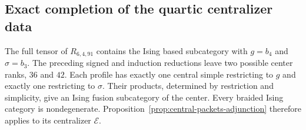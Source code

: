 \subsection{Exact completion of the quartic centralizer data}
\label{subsec:frontier-quartic-completion}

The full tensor of $R_{6,4,91}$ contains the Ising based subcategory
with $g=b_4$ and $\sigma=b_3$. The preceding signed and induction
reductions leave two possible center ranks, $36$ and $42$. Each profile
has exactly one central simple restricting to $g$ and exactly one
restricting to $\sigma$. Their products, determined by restriction and
simplicity, give an Ising fusion subcategory of the center. Every braided
Ising category is nondegenerate. Proposition~\ref{prop:central-packets-adjunction}
therefore applies to its centralizer $\mathcal E$.


